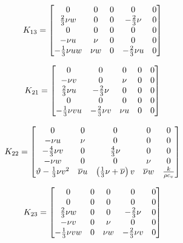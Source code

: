 \begin{equation*}
  K_{13} =
  \begin{bmatrix}
    0          & 0     & 0        & 0        & 0 \\
    \frac{2}{3}\nu w    & 0     & 0        & -\frac{2}{3}\nu   & 0 \\ 
    0          & 0     & 0        & 0        & 0 \\
    -\nu u     & \nu   & 0        & 0        & 0 \\
    -\frac{1}{3}\nu u w & \nu w & 0        & -\frac{2}{3}\nu u & 0
  \end{bmatrix}
\end{equation*}

\begin{equation*}
  K_{21} =
  \begin{bmatrix}
    0          & 0        & 0     & 0 & 0 \\
    -\nu v     & 0        & \nu   & 0 & 0 \\
    \frac{2}{3}\nu u    & -\frac{2}{3}\nu   & 0     & 0 & 0 \\ 
    0          & 0        & 0     & 0 & 0 \\
    -\frac{1}{3}\nu v u & -\frac{2}{3}\nu v & \nu u & 0 & 0
  \end{bmatrix}
\end{equation*}

\begin{equation*}
  K_{22} =
  \begin{bmatrix}
    0                     & 0        & 0                            & 0        & 0 \\
    -\nu u                & \nu      & 0                            & 0        & 0 \\
    -\frac{4}{3}\nu v              & 0        & \frac{4}{3}\nu                        & 0        & 0 \\ 
    -\nu w                & 0        & 0                            & \nu      & 0 \\
    \vartheta - \frac{1}{3}\nu v^2 & \overline{\nu} u & \left(\frac{1}{3}\nu + \overline{\nu}\right)v & \overline{\nu} w & \frac{k}{\rho c_v}
  \end{bmatrix}
\end{equation*}

\begin{equation*}
  K_{23} =
  \begin{bmatrix}
    0          & 0 & 0     & 0        & 0 \\
    0          & 0 & 0     & 0        & 0 \\
    \frac{2}{3}\nu w    & 0 & 0     & -\frac{2}{3}\nu   & 0 \\ 
    -\nu v     & 0 & \nu   & 0        & 0 \\
    -\frac{1}{3}\nu v w & 0 & \nu w & -\frac{2}{3}\nu v & 0
  \end{bmatrix}
\end{equation*}

